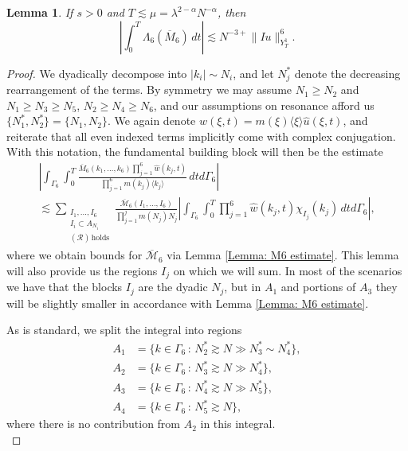 \documentclass[12pt, letterpaper]{amsart}
\newtheorem{lemma}{Lemma}
\begin{document}
\begin{lemma}\label{Lemma: M6 integral term}
If $s > 0$ and $T\lesssim \mu = \lambda^{2-\alpha}N^{-\alpha}$, then
\begin{equation}\label{Equation: L6 lemma integral bound}
\left|\int_0^T\Lambda_6(\overline{M}_6)\,dt\right|\lesssim N^{-3+}\|Iu\|_{Y^1_T}^6.
\end{equation}
\end{lemma}
\begin{proof}
    We dyadically decompose into $|k_i|\sim N_i$, and let $N_j^*$ denote the decreasing rearrangement of the terms. By symmetry we may assume $N_1\geq N_2$ and $N_1\geq N_3\geq N_5$, $N_2\geq N_4\geq N_6$, and our assumptions on resonance afford us $\{N_1^*, N_2^*\} = \{N_1, N_2\}$. We again denote $\widehat{w}(\xi,t) = m(\xi)\langle\xi\rangle \widehat{u}(\xi,t)$, and reiterate that all even indexed terms implicitly come with complex conjugation. With this notation, the fundamental building block will then be the estimate
    \begin{multline}\label{Equation: Resonant Base Estimate}
        \left|\int_{\Gamma_6}\int_0^T\frac{\overline{M}_6(k_1,\dots, k_6)\prod_{j=1}^6\widehat{w}(k_j,t)}{\prod_{j=1}^6m(k_j)\langle k_j\rangle}\,dtd\Gamma_6\right|\\
        \lesssim \sum_{\substack{I_1,\dots, I_6\\I_i\subset A_{N_i}\\(\mathcal{R})\,\mathrm{ holds}}}\frac{\overline{\mathcal{M}}_6(I_1,\dots, I_6)}{\prod_{j=1}^jm(N_j)N_j}\left|\int_{\Gamma_6}\int_0^T\prod_{j=1}^6\widehat{w}(k_j,t)\chi_{I_j}(k_j)\,dtd\Gamma_6\right|,
    \end{multline}
    where we obtain bounds for $\overline{\mathcal{M}}_6$ via Lemma \ref{Lemma: M6 estimate}. This lemma will also provide us the regions $I_j$ on which we will sum. In most of the scenarios we have that the blocks $I_j$ are the dyadic $N_j$, but in $A_1$ and portions of $A_3$ they will be slightly smaller in accordance with Lemma \ref{Lemma: M6 estimate}.

    As is standard, we split the integral into regions
    \begin{align*}
        A_1 &= \{k\in\Gamma_6\,:\,N_2^*\gtrsim N\gg N_3^*\sim N_4^*\},\\
        A_2 &= \{k\in \Gamma_6\,:\, N_3^*\gtrsim N\gg N_4^*\},\\
        A_3 &= \{k\in\Gamma_6\,:\,N_4^*\gtrsim N\gg N_5^*\},\\
        A_4 &= \{k\in\Gamma_6\,:\, N_5^*\gtrsim N\},
    \end{align*}
    where there is no contribution from $A_2$ in this integral.\\
    

\end{proof}
\end{document}
